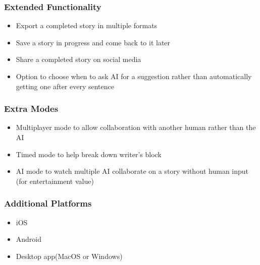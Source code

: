 \subsubsection{Extended Functionality}\label{subsubsec:ext_fun}
\begin{itemize}
  \item Export a completed story in multiple formats
  \item Save a story in progress and come back to it later
  \item Share a completed story on social media
  \item Option to choose when to ask AI for a suggestion rather than automatically
  getting one after every sentence
\end{itemize}
\subsubsection{Extra Modes}\label{subsubsec:extra_modes}
\begin{itemize}
  \item Multiplayer mode to allow collaboration with another human rather than
  the AI
  \item Timed mode to help break down writer’s block
  \item AI mode to watch multiple AI collaborate on a story without human input
  (for entertainment value)
\end{itemize}
\subsubsection{Additional Platforms}\label{subsubsec:addtnl_pltfm}
\begin{itemize}
  \item iOS
  \item Android
  \item Desktop app(MacOS or Windows)
\end{itemize}
